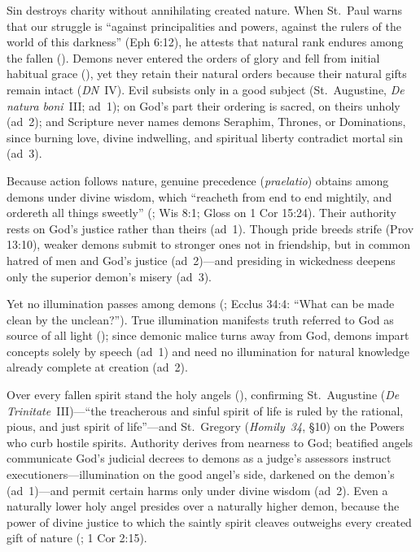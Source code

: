 Sin destroys charity without annihilating created nature. When St.~Paul warns that our struggle is ``against principalities and powers, against the rulers of the world of this darkness'' (Eph 6:12), he attests that natural rank endures among the fallen (). Demons never entered the orders of glory and fell from initial habitual grace (), yet they retain their natural orders because their natural gifts remain intact (\emph{DN}~IV). Evil subsists only in a good subject (St.~Augustine, \emph{De natura boni}~III; ad~1); on God's part their ordering is sacred, on theirs unholy (ad~2); and Scripture never names demons Seraphim, Thrones, or Dominations, since burning love, divine indwelling, and spiritual liberty contradict mortal sin (ad~3).

Because action follows nature, genuine precedence (\emph{praelatio}) obtains among demons under divine wisdom, which ``reacheth from end to end mightily, and ordereth all things sweetly'' (; Wis 8:1; Gloss on 1 Cor 15:24). Their authority rests on God's justice rather than theirs (ad~1). Though pride breeds strife (Prov 13:10), weaker demons submit to stronger ones not in friendship, but in common hatred of men and God's justice (ad~2)---and presiding in wickedness deepens only the superior demon's misery (ad~3).

Yet no illumination passes among demons (; Ecclus 34:4: ``What can be made clean by the unclean?''). True illumination manifests truth referred to God as source of all light (); since demonic malice turns away from God, demons impart concepts solely by speech (ad~1) and need no illumination for natural knowledge already complete at creation (ad~2).

Over every fallen spirit stand the holy angels (), confirming St.~Augustine (\emph{De Trinitate}~III)---``the treacherous and sinful spirit of life is ruled by the rational, pious, and just spirit of life''---and St.~Gregory (\emph{Homily~34}, \S10) on the Powers who curb hostile spirits. Authority derives from nearness to God; beatified angels communicate God's judicial decrees to demons as a judge's assessors instruct executioners---illumination on the good angel's side, darkened on the demon's (ad~1)---and permit certain harms only under divine wisdom (ad~2). Even a naturally lower holy angel presides over a naturally higher demon, because the power of divine justice to which the saintly spirit cleaves outweighs every created gift of nature (; 1 Cor 2:15).

